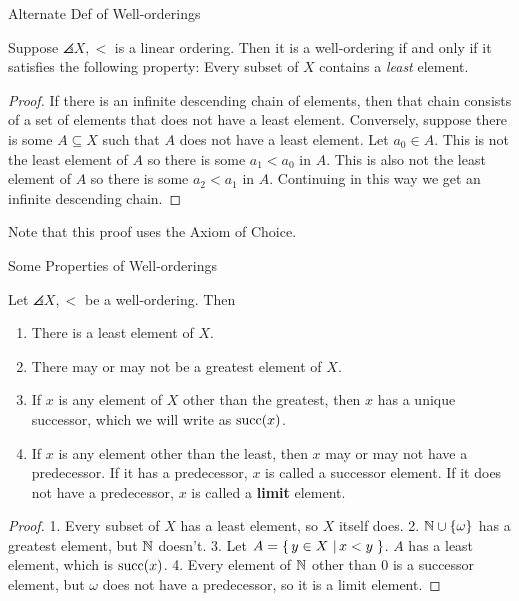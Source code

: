 \documentclass[pdf,final]{prosper}
\newcommand{\skipsmall}{\vspace{1em}}
\begin{document}
\begin{slide}{Alternate Def of Well-orderings}

\begin{lemma}
Suppose $\angles{X,<}$ is a linear ordering. Then it is a well-ordering if and
only if it satisfies the following property: Every subset of $X$ contains a
\emph{least} element.
\end{lemma}
\begin{proof}
If there is an infinite descending chain of elements, then that chain consists
of a set of elements that does not have a least element. Conversely, suppose
there is some $A\subseteq X$ such that $A$ does not have a least element. Let
$a_0\in A$. This is not the least element of $A$ so there is some $a_1<a_0$ in
$A$. This is also not the least element of $A$ so there is some $a_2<a_1$ in
$A$. Continuing in this way we get an infinite descending chain.
\end{proof}

\skipsmall

Note that this proof uses the Axiom of Choice.

\end{slide}

\begin{slide}{Some Properties of Well-orderings}
\begin{lemma}
Let $\angles{X,<}$ be a well-ordering. Then
\begin{enumerate}
  \item There is a least element of $X$.
  \item There may or may not be a greatest element of $X$.
  \item If $x$ is any element of $X$ other than the greatest, then $x$ has a
  unique successor, which we will write as $\operatorname{succ}(x)$.
  \item If $x$ is any element other than the least, then $x$ may or may not have
  a predecessor. If it has a predecessor, $x$ is called a successor element. If
  it does not have a predecessor, $x$  is called a \textbf{limit} element.
\end{enumerate}
\end{lemma}
\begin{proof}
1. Every subset of $X$ has a least element, so $X$ itself does.
2. $\mathbb{N}\cup\left\{\omega\right\}$ has a greatest element, but $\mathbb{N}$ doesn't.
3. Let $A=\left\{ \, y\in X \, \left| \, x<y \, \right.\right\}$. $A$ has a least element, which is $\operatorname{succ}(x)$.
4. Every element of $\mathbb{N}$ other than 0 is a successor element, but $\omega$ does
not have a predecessor, so it is a limit element.
\end{proof}
\end{slide}
\end{document}
